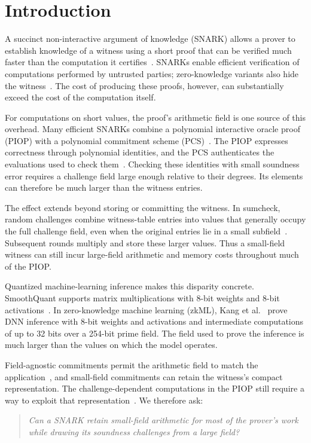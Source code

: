 \section{Introduction}

A succinct non-interactive argument of knowledge (SNARK) allows a
prover to establish knowledge of a witness using a short proof that
can be verified much faster than the computation it
certifies~\cite{innovations/BitanskyCCT12}.
SNARKs enable efficient verification of computations performed by
untrusted parties; zero-knowledge variants also hide the
witness~\cite{eurocrypt/Groth16,crypto/Setty20}.
The cost of producing these proofs, however, can substantially
exceed the cost of the computation itself.

For computations on short values, the proof's arithmetic field is
one source of this overhead. Many efficient SNARKs combine a
polynomial interactive oracle proof (PIOP) with a polynomial
commitment scheme (PCS)~\cite{eurocrypt/BunzFS20,eurocrypt/ChiesaHMMVW20}.
The PIOP expresses correctness through polynomial identities,
and the PCS authenticates the evaluations
used to check them~\cite{crypto/Setty20,eurocrypt/ChenBBZ23}.
Checking these identities with small soundness error requires a
challenge field large enough relative to their degrees.
Its elements can therefore be much larger than the witness entries.

The effect extends beyond storing or committing the witness.
In sumcheck, random challenges combine witness-table entries into
values that generally occupy the full challenge field, even when
the original entries lie in a small subfield~\cite{iacr/BagadDDT25}.
Subsequent rounds multiply and store these larger values. Thus a
small-field witness can still incur large-field arithmetic and
memory costs throughout much of the PIOP.

Quantized machine-learning inference makes this disparity concrete.
SmoothQuant supports matrix multiplications with 8-bit weights and
8-bit activations~\cite{icml/XiaoLSWDH23}.
In zero-knowledge machine learning (zkML), Kang et al.~\cite{corr/KangHSS22}
prove DNN inference with 8-bit weights and activations and
intermediate computations of up to 32 bits over a 254-bit prime field.
The field used to prove the inference is much larger than the
values on which the model operates.

Field-agnostic commitments permit the arithmetic field to match
the application~\cite{crypto/GolovnevLSTW23,crypto/ZeilbergerCF24},
and small-field commitments can retain the
witness's compact representation. The challenge-dependent
computations in the PIOP still require a way to exploit that
representation~\cite{eurocrypt/DiamondP26,iacr/BagadDDT25}.
We therefore ask:
\begin{quote}
\emph{Can a SNARK retain small-field arithmetic for most of the
prover's work while drawing its soundness challenges from a large field?}
\end{quote}

